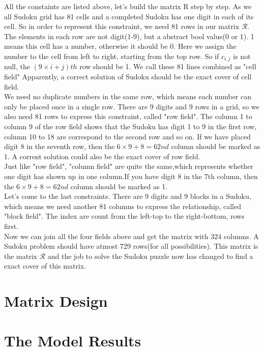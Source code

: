 \documentclass{mcmthesis}
\begin{document}
\indent All the constaints are listed above, let's build the matrix R step by step. As we all Sudoku grid has 81 cells and a completed Sudoku has one digit in each of its cell. So in order to represent this constraint, we need 81 rows in our matrix $\mathcal{R}$. The elements in each row are not digit(1-9), but a abstract bool value(0 or 1). 1 means this cell has a number, otherwise it should be 0. Here we assign the number to the cell from left to right, starting from the top row. So if $\textit{c}_{i,j}$ is not null, the $(9\times i + j)th$ row should be 1. We call these 81 lines combined as "cell field" Apparently, a correct solution of Sudoku should be the exact cover of cell field.\\
\indent We need no duplicate numbers in the same row, which means each number can only be placed once in a single row. There are 9 digits and 9 rows in a grid, so we also need 81 rows to express this constraint, called "row field". The column 1 to column 9 of the row field shows that the Sudoku has digit 1 to 9 in the first row, column 10 to 18 are correspond to the second row and so on. If we have placed digit 8 in the seventh row, then the $6\times9+8=62nd$ column should be marked as 1. A corrent solution could also be the exact cover of row field.\\
\indent Just like "row field", "column field" are quite the same,which represents whether one digit has shown up in one column.If you have digit 8 in the 7th column, then the  $6\times9+8=62nd$ column should be marked as 1.\\
\indent Let's come to the last constraints. There are 9 digits and 9 blocks in a Sudoku, which means we need another 81 columns to express the relationship, called "block field". The index are count from the left-top to the right-bottom, rows first. \\
\indent Now we can join all the four fields above and get the matrix with 324 columns. A Sudoku problem should have atmost 729 rows(for all possibilities). This matrix is the matrix $\mathcal{R}$ and the job to solve the Sudoku puzzle now has changed to find a exact cover of this matrix. \newline 
\section{Matrix Design}



\section{The Model Results}
\end{document}
